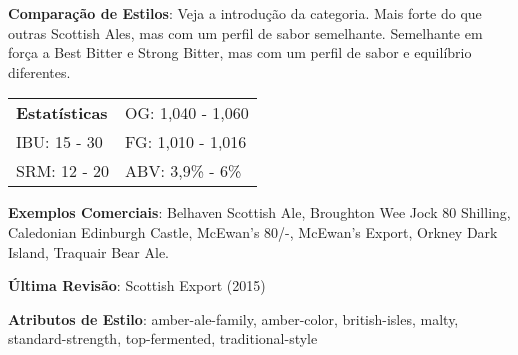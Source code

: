 \textbf{Comparação de Estilos}: Veja a introdução da categoria. Mais forte do que outras Scottish Ales, mas com um perfil de sabor semelhante. Semelhante em força a Best Bitter e Strong Bitter, mas com um perfil de sabor e equilíbrio diferentes.

\begin{tabular}{@{}p{35mm}p{35mm}@{}}
  \textbf{Estatísticas} & OG: 1,040 - 1,060 \\
  IBU: 15 - 30  & FG: 1,010 - 1,016 \\
  SRM: 12 - 20  & ABV: 3,9\% - 6\%
\end{tabular}

\textbf{Exemplos Comerciais}: Belhaven Scottish Ale, Broughton Wee Jock 80 Shilling, Caledonian Edinburgh Castle, McEwan’s 80/-, McEwan’s Export, Orkney Dark Island, Traquair Bear Ale.

\textbf{Última Revisão}: Scottish Export (2015)

\textbf{Atributos de Estilo}: amber-ale-family, amber-color, british-isles, malty, standard-strength, top-fermented, traditional-style
